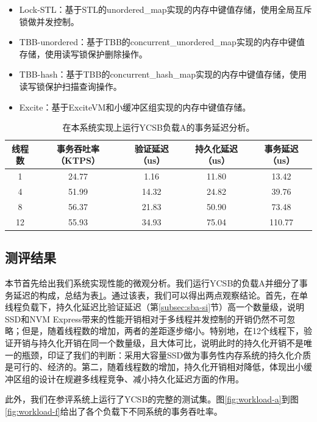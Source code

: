 \begin{itemize}
\item Lock-STL：基于STL的unordered\_map实现的内存中键值存储，使用全局互斥锁做并发控制。
\item TBB-unordered：基于TBB的concurrent\_unordered\_map\cite{TBB:concurrent-unordered-map}实现的内存中键值存储，使用读写锁保护删除操作。
\item TBB-hash：基于TBB的concurrent\_hash\_map\cite{TBB:concurrent-hash-map}实现的内存中键值存储，使用读写锁保护扫描查询操作。
\item Excite：基于ExciteVM和小缓冲区组实现的内存中键值存储。

\end{itemize}

\begin{table}[!ht]
\caption{在本系统实现上运行YCSB负载A的事务延迟分析。}
\label{tab:sba-micro}
\centering
\begin{tabular}{|c|c|c|c|c|}
\hline
线程数 &	事务吞吐率（KTPS）& 验证延迟（us） &	 持久化延迟（us） & 事务延迟（us）\\
\hline
1 &	24.77 & 1.16 & 11.80 & 13.42 \\
\hline
4 & 51.99 & 14.32 & 24.82 & 39.76 \\
\hline
8 & 56.37 & 21.83 & 50.90 & 73.48 \\
\hline
12 & 55.93 & 34.93 & 75.04 & 110.77 \\
\hline
\end{tabular}
\end{table}


\subsection{测评结果}

本节首先给出我们系统实现性能的微观分析。我们运行YCSB的负载A并细分了事务延迟的构成，总结为表\ref{tab:sba-micro}。通过该表，我们可以得出两点观察结论。首先，在单线程负载下，持久化延迟比验证延迟（第\ref{subsec:sba-si}节）高一个数量级，说明SSD和NVM Express带来的性能开销相对于多线程并发控制的开销仍然不可忽略；但是，随着线程数的增加，两者的差距逐步缩小。特别地，在12个线程下，验证开销与持久化开销在同一个数量级，且大体可比，说明此时的持久化开销不是唯一的瓶颈，印证了我们的判断：采用大容量SSD做为事务性内存系统的持久化介质是可行的、经济的。第二，随着线程数的增加，持久化开销相对降低，体现出小缓冲区组的设计在规避多线程竞争、减小持久化延迟方面的作用。

此外，我们在参评系统上运行了YCSB的完整的测试集。图\ref{fig:workload-a}到图\ref{fig:workload-f}给出了各个负载下不同系统的事务吞吐率。

